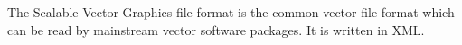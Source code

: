 \documentclass[12pt,letterpaper]{article}
\begin{document}
The Scalable Vector Graphics file format is the common vector file format which can be read by mainstream vector software packages. It is written in XML.

\newpage


\appendix
\listoffigures
\listoftables

\end{document}
